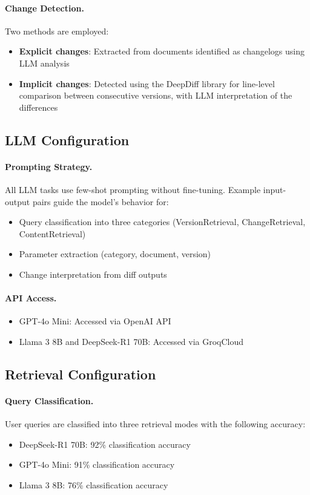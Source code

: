 \paragraph{Change Detection.}
Two methods are employed:
\begin{itemize}
    \item \textbf{Explicit changes}: Extracted from documents identified as changelogs using LLM analysis
    \item \textbf{Implicit changes}: Detected using the DeepDiff library for line-level comparison between consecutive versions, with LLM interpretation of the differences
\end{itemize}

\subsection{LLM Configuration}

\paragraph{Prompting Strategy.}
All LLM tasks use few-shot prompting without fine-tuning. Example input-output pairs guide the model's behavior for:
\begin{itemize}
    \item Query classification into three categories (VersionRetrieval, ChangeRetrieval, ContentRetrieval)
    \item Parameter extraction (category, document, version)
    \item Change interpretation from diff outputs
\end{itemize}

\paragraph{API Access.}
\begin{itemize}
    \item GPT-4o Mini: Accessed via OpenAI API
    \item Llama 3 8B and DeepSeek-R1 70B: Accessed via GroqCloud
\end{itemize}

\subsection{Retrieval Configuration}

\paragraph{Query Classification.}
User queries are classified into three retrieval modes with the following accuracy:
\begin{itemize}
    \item DeepSeek-R1 70B: 92\% classification accuracy
    \item GPT-4o Mini: 91\% classification accuracy
    \item Llama 3 8B: 76\% classification accuracy
\end{itemize}

